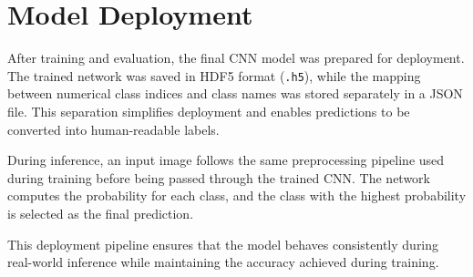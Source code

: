 \documentclass[a4paper,12pt]{report}
\begin{document}
\section{Model Deployment}
\label{sec:model-deployment}

After training and evaluation, the final CNN model was prepared for
deployment. The trained network was saved in HDF5 format (\texttt{.h5}),
while the mapping between numerical class indices and class names was
stored separately in a JSON file. This separation simplifies deployment and
enables predictions to be converted into human-readable labels.

During inference, an input image follows the same preprocessing pipeline
used during training before being passed through the trained CNN. The
network computes the probability for each class, and the class with the
highest probability is selected as the final prediction.

This deployment pipeline ensures that the model behaves consistently
during real-world inference while maintaining the accuracy achieved during
training.
\end{document}
